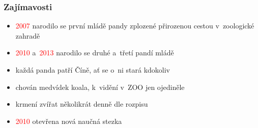 \documentclass[pdf]{beamer}
\begin{document}
\begin{frame}
\frametitle{Zajímavosti}
\begin{itemize}
\item{\textcolor{red}{2007} narodilo se první mládě pandy zplozené přirozenou cestou v~zoologické zahradě}
\item{\textcolor{red}{2010} a~\textcolor{red}{2013} narodilo se druhé a~třetí pandí mládě}
\item{každá panda patří Číně, ať se o~ni stará kdokoliv}
\item{chován medvídek koala, k~vidění v~ZOO jen ojediněle}
\item{krmení zvířat několikrát denně dle rozpisu}
\item{\textcolor{red}{2010} otevřena nová naučná stezka}
\end{itemize}
\centering
  \begin{columns}
  \qquad
   \begin{column}{0.5\textwidth}
  \end{column}
  \end{columns}
\end{frame}
\end{document}

